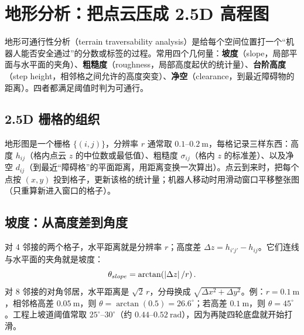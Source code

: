 \section{地形分析：把点云压成 2.5D 高程图}\label{sec:21-terrain}

\begin{definition}[地形可通行性分析]
地形可通行性分析（terrain traversability analysis）是给每个空间位置打一个“机器人能否安全通过”的分数或标签的过程。常用四个几何量：\textbf{坡度}（slope，局部平面与水平面的夹角）、\textbf{粗糙度}（roughness，局部高度起伏的统计量）、\textbf{台阶高度}（step height，相邻格之间允许的高度突变）、\textbf{净空}（clearance，到最近障碍物的距离）。四者都满足阈值时判为可通行。
\end{definition}

\subsection{2.5D 栅格的组织}

地形图是一个栅格 $\{(i,j)\}$，分辨率 $r$ 通常取 $0.1$--$0.2\ \mathrm{m}$，每格记录三样东西：高度 $h_{ij}$（格内点云 $z$ 的中位数或最低值）、粗糙度 $\sigma_{ij}$（格内 $z$ 的标准差）、以及净空 $d_{ij}$（到最近“障碍格”的平面距离，用距离变换一次算出）。点云到来时，把每个点按 $(x,y)$ 投到格子，更新该格的统计量；机器人移动时用滑动窗口平移整张图（只重算新进入窗口的格子）。

\subsection{坡度：从高度差到角度}

对 4 邻接的两个格子，水平距离就是分辨率 $r$；高度差 $\Delta z=h_{i'j'}-h_{ij}$。它们连线与水平面的夹角就是坡度：
\begin{equation}
  \theta_{slope}=\arctan\!\left(\left\lvert \Delta z \right\rvert/r\right).
  \label{eq:21-slope}
\end{equation}
对 8 邻接的对角邻居，水平距离是 $\sqrt2\,r$，分母换成 $\sqrt{\Delta x^2+\Delta y^2}$。例：$r=0.1\ \mathrm{m}$，相邻格高差 $0.05\ \mathrm{m}$，则 $\theta=\arctan(0.5)=26.6^\circ$；若高差 $0.1\ \mathrm{m}$，则 $\theta=45^\circ$。工程上坡道阈值常取 $25^\circ$--$30^\circ$（约 $0.44$--$0.52\ \mathrm{rad}$），因为再陡四轮底盘就开始打滑。

